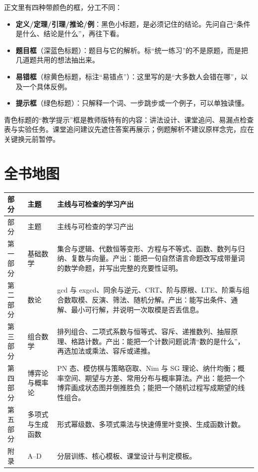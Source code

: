 \documentclass[a4paper,twoside,openright,11pt,fontset=fandol]{ctexbook}
\theoremstyle{definition}
\begin{document}
\begin{tip}[本书的四种框]
正文里有四种带颜色的框，分工不同：
\begin{itemize}
\item \textbf{定义/定理/引理/推论/例}：黑色小标题，是必须记住的结论。先问自己“条件是什么、结论是什么”，再往下看。
\item \textbf{题目框}（深蓝色标题）：题目与它的解析。标“统一练习”的不是原题，而是把几道题共用的想法抽出来。
\item \textbf{易错框}（棕黄色标题，标注“易错点”）：这里写的是“大多数人会错在哪”，以及一个具体反例。
\item \textbf{提示框}（绿色标题）：只解释一个词、一步跳步或一个例子，可以单独读懂。
\end{itemize}
\begin{teach}[教学提示框]
青色标题的“教学提示”框是教师版特有的内容：讲法设计、课堂追问、易漏点检查表与实验任务。课堂追问建议先遮住答案再展示；例题解析不建议原样念完，应在关键换元前暂停。
\end{teach}
\end{tip}

\section*{全书地图}
\begin{longtable}{p{}p{}p{}}
\toprule
部分 & 主题 & 主线与可检查的学习产出\\
\midrule
\endfirsthead
\toprule
部分 & 主题 & 主线与可检查的学习产出\\
\midrule
\endhead
第一部分 & 基础数学 & 集合与逻辑、代数恒等变形、方程与不等式、函数、数列与归纳、复数与向量。产出：能把一句自然语言命题改写成带量词的数学命题，并写出完整的充要性证明。\\
第二部分 & 数论 & gcd 与 exgcd、同余与逆元、CRT、阶与原根、LTE、阶乘与组合数取模、反演、筛法、随机分解。产出：能写出条件、通解、最小可行解，并说明一次取模是否丢信息。\\
第三部分 & 组合数学 & 排列组合、二项式系数与恒等式、容斥、递推数列、抽屉原理、格路计数。产出：能把一个计数问题说清“数的是什么”，再选加法或乘法、容斥或递推。\\
第四部分 & 博弈论与概率论 & PN 态、模仿棋与策略窃取、Nim 与 SG 理论、纳什均衡；概率空间、期望与方差、常用分布与概率算法。产出：能把一个博弈画成状态图并倒推胜负；能把一个随机过程写成期望的线性组合。\\
第五部分 & 多项式与生成函数 & 形式幂级数、多项式乘法与快速傅里叶变换、生成函数计数。\\
附录 & A--D & 分层训练、核心模板、课堂设计与判定模板。\\
\bottomrule
\end{longtable}
\end{document}
